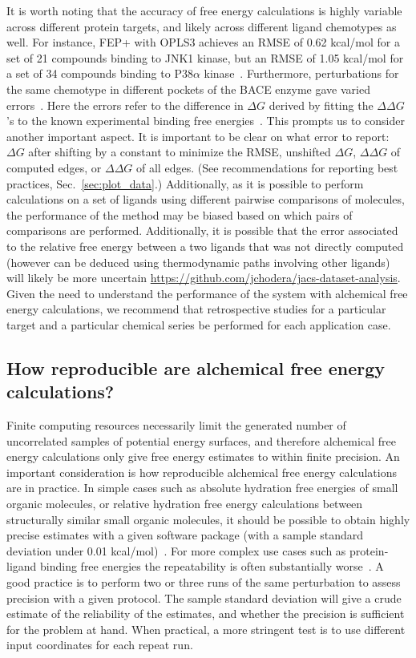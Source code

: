 \documentclass[9pt,bestpractices]{livecoms}
\begin{document}
It is worth noting that the accuracy of free energy calculations is highly variable across different protein targets, and likely across different ligand chemotypes as well.
For instance, FEP+ with OPLS3 achieves an RMSE of 0.62 kcal/mol for a set of 21 compounds binding to JNK1 kinase, but an RMSE of 1.05 kcal/mol for a set of 34 compounds binding to P38$\alpha$ kinase~\cite{harder2016opls3}.
Furthermore, perturbations for the same chemotype in different pockets of the BACE enzyme gave varied errors~\cite{keranen2017acylguanidine}. Here the errors refer to the difference in $\Delta G$ derived by fitting the $\Delta \Delta G$'s to the known experimental binding free energies~\cite{wang2015accurate}. This prompts us to consider another important aspect. It is important to be clear on what error to report: $\Delta G$ after shifting by a constant to minimize the RMSE, unshifted $\Delta G$, $\Delta \Delta G$ of computed edges, or $\Delta \Delta G$ of all edges. (See recommendations for reporting best practices, Sec.~\ref{sec:plot_data}.) Additionally, as it is possible to perform calculations on a set of ligands using different pairwise comparisons of molecules, the performance of the method may be biased based on which pairs of comparisons are performed. Additionally, it is possible that the error associated to the relative free energy between a two ligands that was not directly computed (however can be deduced using thermodynamic paths involving other ligands) will likely be more uncertain \url{https://github.com/jchodera/jacs-dataset-analysis}.
Given the need to understand the performance of the system with alchemical free energy calculations, we recommend that retrospective studies for a particular target and a particular chemical series be performed for each application case.

\subsection{How reproducible are alchemical free energy calculations?}
\label{subsec:reproducible}
Finite computing resources necessarily limit the generated number of uncorrelated samples of potential energy surfaces, and therefore alchemical free energy calculations only give free energy estimates to within finite precision. An important consideration is how reproducible alchemical free energy calculations are in practice. In simple cases such as absolute hydration free energies of small organic molecules, or relative hydration free energy calculations between structurally similar small organic molecules, it should be possible to obtain highly precise estimates with a given software package (with a sample standard deviation under 0.01 kcal/mol)~\cite{rizzi2019sampl6}.
For more complex use cases such as protein-ligand binding free energies the repeatability is often substantially worse~\cite{rizzi2019sampl6}. A good practice is to perform two or three runs of the same perturbation to assess precision with a given protocol. The sample standard deviation will give a crude estimate of the reliability of the estimates, and whether the precision is sufficient for the problem at hand. When practical, a more stringent test is to use different input coordinates for each repeat run. 
\end{document}
